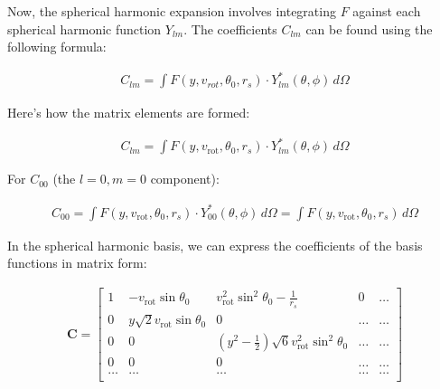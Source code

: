 \documentclass[modern]{aastex631}
\begin{document}


Now, the spherical harmonic expansion involves integrating \( F \) against each spherical harmonic function \( Y_{lm} \). 
The coefficients \( C_{lm} \) can be found using the following formula:

\begin{linenomath}\begin{align}
    C_{lm} = \int F(y, v_{rot}, \theta_0, r_s) \cdot Y_{lm}^*(\theta, \phi) \, d\Omega 
\end{align}\end{linenomath}

Here's how the matrix elements are formed:

\begin{linenomath}\begin{align}
C_{lm} = \int F(y, v_{\text{rot}}, \theta_0, r_s) \cdot Y_{lm}^*(\theta, \phi) \, d\Omega 
\end{align}\end{linenomath}

For \( C_{00} \) (the \( l = 0, m = 0 \) component):

\begin{linenomath}\begin{align}
    C_{00} = \int F(y, v_{\text{rot}}, \theta_0, r_s) \cdot Y_{00}^*(\theta, \phi) \, d\Omega = \int F(y, v_{\text{rot}}, \theta_0, r_s) \, d\Omega 
\end{align}\end{linenomath}


In the spherical harmonic basis, we can express the coefficients of the basis functions in matrix form:

\begin{multline}
    \mathbf{C} = \begin{bmatrix}
    1 & -v_{\text{rot}}\sin{\theta_0} & v_{\text{rot}}^2\sin^2{\theta_0} - \frac{1}{r_s} & 0 & \ldots \\
    0 & y\sqrt{2}v_{\text{rot}}\sin{\theta_0} & 0 & \ldots & \ldots \\
    0 & 0 & (y^2 - \frac{1}{2})\sqrt{6}v_{\text{rot}}^2\sin^2{\theta_0} & \ldots & \ldots \\
    0 & 0 & 0 & \ldots & \ldots \\
    \ldots & \ldots & \ldots & \ldots & \ldots \\
    \end{bmatrix}
\end{multline}
\end{document}
